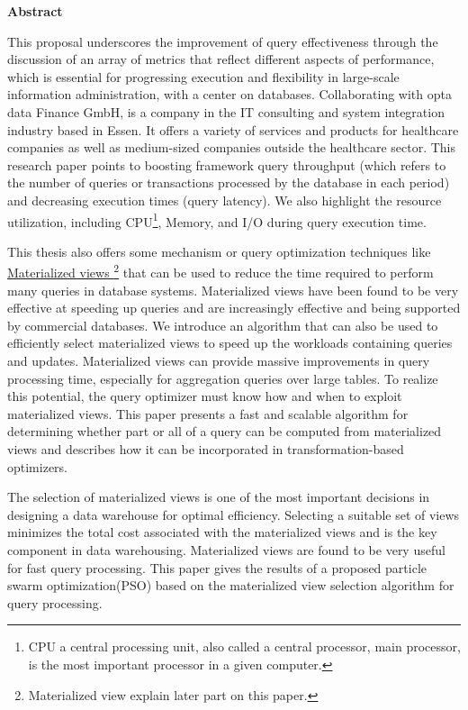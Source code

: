 \thispagestyle{empty}
\begin{center}
    \fancyhead[]{}\Large\textbf{Abstract}
\end{center}

\normalsize
This proposal underscores the improvement of query effectiveness through the discussion of an array of metrics that reflect different aspects of performance, which is essential for progressing execution and flexibility in large-scale information administration, with a center on databases. Collaborating with opta data Finance GmbH, is a company in the IT consulting and system integration industry based in Essen. It offers a variety of services and products for healthcare companies as well as medium-sized companies outside the healthcare sector. This research paper points to boosting framework query throughput (which refers to the number of queries or transactions processed by the database in each period) and decreasing execution times (query latency). We also highlight the resource utilization,  including CPU\footnote{CPU a central processing unit, also called a central processor, main processor, is the most important processor in a given computer.}, Memory, and I/O during query execution time.\vspace{.4cm}

This thesis also offers some mechanism or query optimization techniques like \hyperref[term:materialized_views]{Materialized views \footnote{Materialized view explain later part on this paper.}} that can be used to reduce the time required to perform many queries in database systems. Materialized views have been found to be very effective at speeding up queries and are increasingly effective and being supported by commercial databases. We introduce an algorithm that can also be used to efficiently select materialized views to speed up the workloads containing queries and updates. Materialized views can provide massive improvements in query processing time, especially for aggregation queries over large tables. To realize this potential, the query optimizer must know how and when to exploit materialized views. This paper presents a fast and scalable algorithm for determining whether part or all of a query can be computed from materialized views and describes how it can be incorporated in transformation-based optimizers.\vspace{.4cm}

The selection of materialized views is one of the most important decisions in designing a data warehouse for optimal efficiency. Selecting a suitable set of views minimizes the total cost associated with the materialized views and is the key component in data warehousing. Materialized views are found to be very useful for fast query processing. This paper gives the results of a proposed particle swarm optimization(PSO) based on the materialized view selection algorithm for query processing.\vspace{.4cm}



